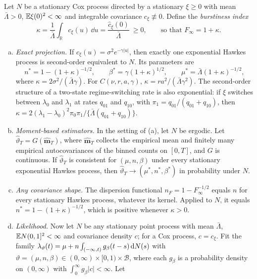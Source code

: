 \begin{theorem}\label{thm:spurious}
Let $N$ be a stationary Cox process directed by a stationary $\xi\ge0$ with mean
$\bar\Lambda>0$, $\mathbb{E}\xi(0)^2<\infty$ and integrable covariance $c_\xi\not\equiv0$.
Define the \emph{burstiness index}
\[
\kappa=\frac1{\bar\Lambda}\int_{\mathbb R}c_\xi(u)\,\dd u=\frac{\hat c_\xi(0)}{\bar\Lambda}\ \ge0,
\qquad\text{so that }F_\infty=1+\kappa .
\]
\begin{enumerate}[(a)]
  \item \emph{Exact projection.} If $c_\xi(u)=\sigma^2e^{-\gamma|u|}$, then exactly one
  exponential Hawkes process is second-order equivalent to $N$. Its parameters are
  \begin{equation}\label{eq:th-nstar}
    n^{*}=1-(1+\kappa)^{-1/2},\qquad \beta^{*}=\gamma(1+\kappa)^{1/2},\qquad
    \mu^{*}=\bar\Lambda(1+\kappa)^{-1/2},
  \end{equation}
  where $\kappa=2\sigma^2/(\bar\Lambda\gamma)$. For $C(\nu,r,a,\gamma)$,
  $\kappa=r a^2/(\bar\Lambda\gamma^2)$. The second-order structure of a two-state
  regime-switching rate is also exponential: if $\xi$ switches between $\lambda_0$
  and $\lambda_1$ at rates $q_{01}$ and $q_{10}$, with
  $\pi_1=q_{01}/(q_{01}+q_{10})$, then
  $\kappa=2(\lambda_1-\lambda_0)^2\pi_0\pi_1/\{\bar\Lambda(q_{01}+q_{10})\}$.
  \item \emph{Moment-based estimators.} In the setting of (a), let $N$ be ergodic. Let
  $\hat\vartheta_T=G(\hat{\bm m}_T)$, where $\hat{\bm m}_T$ collects the empirical mean and
  finitely many empirical autocovariances of the binned counts on $[0,T]$, and $G$ is
  continuous. If $\hat\vartheta_T$ is consistent for $(\mu,n,\beta)$ under every
  stationary exponential Hawkes process, then $\hat\vartheta_T\to(\mu^*,n^*,\beta^*)$ in
  probability under $N$.
  \item \emph{Any covariance shape.} The dispersion functional
  $n_F=1-F_\infty^{-1/2}$ equals $n$ for every stationary Hawkes process, whatever its
  kernel. Applied to $N$, it equals $n^*=1-(1+\kappa)^{-1/2}$, which is positive
  whenever $\kappa>0$.
  \item \emph{Likelihood.} Now let $N$ be any stationary point process with mean
  $\bar\Lambda$, $\mathbb{E} N(0,1]^2<\infty$ and covariance density $c$; for a Cox process,
  $c=c_\xi$. Fit the family
  $\lambda_\vartheta(t)=\mu+n\int_{(-\infty,t)}g_\beta(t-s)\,\mathrm{d}N(s)$ with
  $\vartheta=(\mu,n,\beta)\in(0,\infty)\times[0,1)\times\mathcal B$, where each $g_\beta$
  is a probability density on $(0,\infty)$ with $\int_0^\infty g_\beta|c|<\infty$. Let

\end{enumerate}
\end{theorem}

